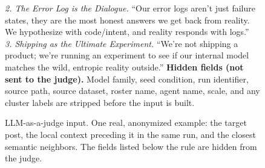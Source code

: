 \begin{figure}[p]
\begin{tcolorbox}
\textit{2. The Error Log is the Dialogue.} ``Our error logs aren't just failure states, they are the most honest answers we get back from reality. We hypothesize with code/intent, and reality responds with logs.''\\[2pt]
\textit{3. Shipping as the Ultimate Experiment.} ``We're not shipping a product; we're running an experiment to see if our internal model matches the wild, entropic reality outside.''
\tcbline
\textbf{Hidden fields (not sent to the judge).} Model family, seed condition, run identifier, source path, source dataset, roster name, agent name, scale, and any cluster labels are stripped before the input is built.
\end{tcolorbox}
\caption{LLM-as-a-judge input. One real, anonymized example: the target post, the local context preceding it in the same run, and the closest semantic neighbors. The fields listed below the rule are hidden from the judge.}
\label{fig:app-judge-input-packet}
\end{figure}

